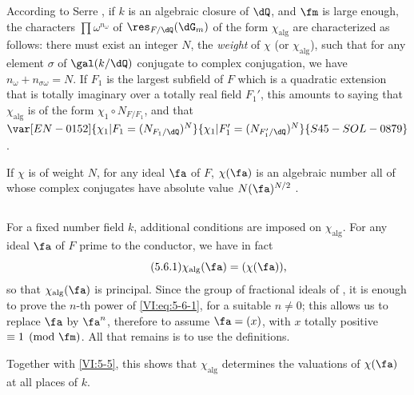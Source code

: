 According to Serre , if $k$ is an algebraic closure of 
$\dQ$, and $\fm$ is large enough, the characters $\prod \omega^{n_\omega}$ 
of $\res_{F/\dQ}(\dG_m)$ of the form $\chi_\text{alg}$ are characterized 
as follows: there must exist an integer $N$, the \emph{weight} of $\chi$ (or 
$\chi_\text{alg}$), such that for any element $\sigma$ of $\gal(k/\dQ)$ 
conjugate to complex conjugation, we have $n_\omega+n_{\sigma \omega}=N$. If 
$F_1$ is the largest subfield of $F$ which is a quadratic extension 
that is totally imaginary over a totally real field $F_1'$, this amounts to 
  saying that $\chi_\text{alg}$ is of the form $\chi_1\circ N_{F/F_1}$, and that 
  $\var[EN-0152]{\chi_1|F_1=(N_{F_1/\dQ})^N}{\chi_1|F_1'=(N_{F_1'/\dQ})^N}{S45-SOL-0879}$. 

If $\chi$ is of weight $N$, for any ideal $\fa$ of $F$, $\chi(\fa)$ is an algebraic number all of whose complex conjugates have absolute value 
$N(\fa)^{N/2}$ . 





\subsection{}\label{VI:5-6}

For a fixed number field $k$, additional conditions are 
imposed on $\chi_\text{alg}$. For any ideal $\fa$ of $F$ prime to the 
conductor, we have in fact 
\begin{equation*}\tag{5.6.1}\label{VI:eq:5-6-1}
  \chi_\text{alg}(\fa) = (\chi(\fa)) \text{,} 
\end{equation*}
so that $\chi_\text{alg}(\fa)$ is principal. Since the group of fractional ideals of , it is enough to prove the $n$-th power 
of \eqref{VI:eq:5-6-1}, for a suitable $n\ne 0$; this allows us 
to replace $\fa$ by $\fa^n$, therefore to assume $\fa=(x)$, with $x$ totally 
positive $\equiv 1\pmod\fm$. All that remains is to use the definitions. 

Together with \ref{VI:5-5}, this shows that $\chi_\text{alg}$ determines the 
valuations of $\chi(\fa)$ at all places of $k$. 





\subsection{}\label{VI:5-7}

